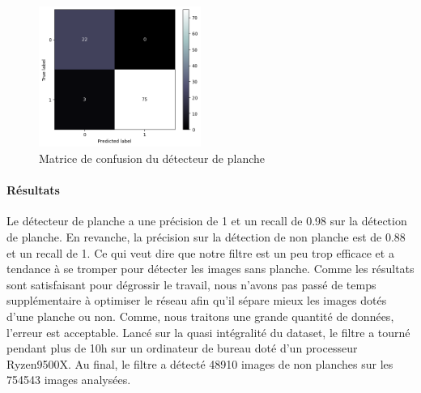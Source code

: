 \begin{figure}[!htb]
    \centering
    \includegraphics[width=200px]{images/filtre_cmatrix}
    \caption{Matrice de confusion du détecteur de planche}
    \label{fig:Matrice de confusion du filtre}
\end{figure}

\paragraph*{Résultats}

Le détecteur de planche a une précision de 1 et un recall de 0.98 sur la détection de planche. En revanche, la précision sur la détection de non planche est de 0.88 et un recall de 1. Ce qui veut dire que notre filtre est un peu trop efficace et a tendance à se tromper pour détecter les images sans planche. Comme les résultats sont satisfaisant pour dégrossir le travail, nous n'avons pas passé de temps supplémentaire à optimiser le réseau afin qu'il sépare mieux les images dotés d'une planche ou non. Comme, nous traitons une grande quantité de données, l'erreur est acceptable. Lancé sur la quasi intégralité du dataset, le filtre a tourné pendant plus de 10h sur un ordinateur de bureau doté d'un processeur Ryzen9500X. Au final, le filtre a détecté 48910 images de non planches sur les 754543 images analysées.